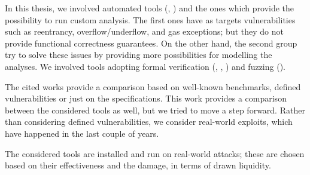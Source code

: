 In this thesis, we involved automated tools (\citet{Slither}, \citet {Mythril}) and the ones which provide the possibility to run custom analysis.
The first ones have as targets vulnerabilities such as reentrancy, overflow/underflow, and gas exceptions; but they do not provide functional correctness guarantees. 
On the other hand, the second group try to solve these issues by providing more possibilities for modelling the analyses. 
We involved tools adopting formal verification (\citet{CertoraDocumentation}, \citet{SolcVerify}, \citet{CelestialPaper}) and fuzzing (\citet{Echidna}). 

The cited works provide a comparison based on well-known benchmarks, defined vulnerabilities or just on the specifications.
This work provides a comparison between the considered tools as well, 
but we tried to move a step forward.
Rather than considering defined vulnerabilities, we consider real-world exploits, which have happened in the last couple of years.

The considered tools are installed and run on real-world attacks; these are chosen based on their effectiveness and the damage, in terms of drawn liquidity.